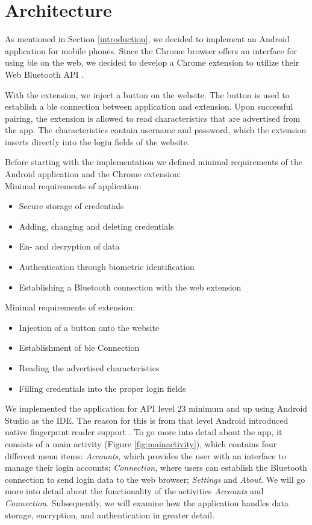 \section{Architecture} \label{architecture}
As mentioned in Section \ref{introduction}, we decided to implement an Android application for mobile phones. Since the Chrome browser offers an interface for using \gls{ble} on the web, we decided to develop a Chrome extension to utilize their Web Bluetooth API \cite{WebBTAPI}.

With the extension, we inject a button on the website. The button is used to establish a \gls{ble} connection between application and extension. Upon successful pairing, the extension is allowed to read characteristics that are advertised from the app. The characteristics contain username and password, which the extension inserts directly into the login fields of the website.

\noindent Before starting with the implementation we defined minimal requirements of the Android application and the Chrome extension: \\

\noindent Minimal requirements of application:
\begin{itemize}
\item Secure storage of credentials
\item Adding, changing and deleting credentials
\item En- and decryption of data 
\item Authentication through biometric identification
\item Establishing a Bluetooth connection with the web extension
\end{itemize}
\vspace{0.3cm}
\noindent Minimal requirements of extension:
\begin{itemize}
\item Injection of a button onto the website
\item Establishment of \gls{ble} Connection
\item Reading the advertised characteristics
\item Filling credentials into the proper login fields
\end{itemize}


\noindent We implemented the application for API level 23 minimum and up using Android Studio as the IDE. The reason for this is from that level Android introduced native fingerprint reader support \cite{AndroidM}. To go more into detail about the app, it consists of a main activity (Figure \ref{fig:mainactivity}), which contains four different menu items: \textit{Accounts}, which provides the user with an interface to manage their login accounts; \textit{Connection}, where users can establish the Bluetooth connection to send login data to the web browser; \textit{Settings} and \textit{About}. We will go more into detail about the functionality of the activities \textit{Accounts} and \textit{Connection}. Subsequently, we will examine how the application handles data storage, encryption, and authentication in greater detail.

